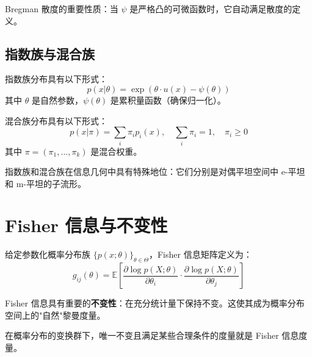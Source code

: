 Bregman 散度的重要性质：当 $\psi$ 是严格凸的可微函数时，它自动满足散度的定义。

\subsection{指数族与混合族}\label{def:families}

\begin{Definition}[指数族]\label{def:exponential-family}
    指数族分布具有以下形式：
    \begin{equation}
        p(x|\theta) = \exp\left(\theta \cdot u(x) - \psi(\theta)\right)
    \end{equation}
    其中 $\theta$ 是自然参数，$\psi(\theta)$ 是累积量函数（确保归一化）。
\end{Definition}

\begin{Definition}[混合族]\label{def:mixture-family}
    混合族分布具有以下形式：
    \begin{equation}
        p(x|\pi) = \sum_i \pi_i p_i(x), \quad \sum_i \pi_i = 1, \quad \pi_i \geq 0
    \end{equation}
    其中 $\pi = (\pi_1, \ldots, \pi_k)$ 是混合权重。
\end{Definition}

指数族和混合族在信息几何中具有特殊地位：它们分别是对偶平坦空间中 e-平坦和 m-平坦的子流形。

\section{Fisher 信息与不变性}\label{sec:fisher}

\begin{Definition}\label{def:fisher-information}
    给定参数化概率分布族 $\{p(x;\theta)\}_{\theta \in \Theta}$，Fisher 信息矩阵定义为：
    \begin{equation}
        g_{ij}(\theta) = \mathbb{E}\left[\frac{\partial \log p(X;\theta)}{\partial \theta_i} \cdot \frac{\partial \log p(X;\theta)}{\partial \theta_j}\right]
    \end{equation}
\end{Definition}

Fisher 信息具有重要的\textbf{不变性}：在充分统计量下保持不变。这使其成为概率分布空间上的"自然"黎曼度量。

\begin{Proposition}\label{prop:fisher-unique}
    在概率分布的变换群下，唯一不变且满足某些合理条件的度量就是 Fisher 信息度量。
\end{Proposition}

